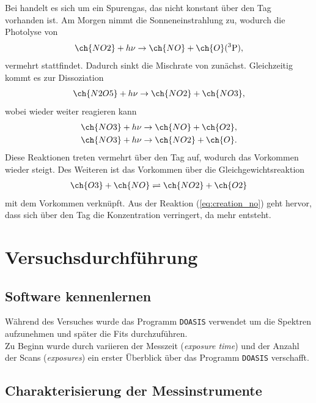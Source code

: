 \documentclass[12pt, a4paper, bibliography=totoc]{scrartcl}
\begin{document}
\begin{multicols}{2}
Bei  handelt es sich um ein Spurengas, das nicht konstant über den Tag vorhanden ist.
Am Morgen nimmt die Sonneneinstrahlung zu, wodurch die Photolyse von 
\begin{align}
    \ch{NO2} + h \nu \to \ch{NO} + \ch{O} (^3\text{P}), \label{eq:creation_no}
\end{align}
vermehrt stattfindet.
Dadurch sinkt die Mischrate von  zunächst.
Gleichzeitig kommt es zur Dissoziation 
\begin{align}
    \ch{N2O5} + h\nu \to \ch{NO2} + \ch{NO3},
\end{align}
wobei  wieder weiter reagieren kann
\begin{align}
    \ch{NO3} + h\nu \to \ch{NO} + \ch{O2}, \\
    \ch{NO3} + h\nu \to \ch{NO2} + \ch{O}.
\end{align}
Diese Reaktionen treten vermehrt über den Tag auf, wodurch das  Vorkommen wieder steigt. 
Des Weiteren ist das  Vorkommen über die Gleichgewichtsreaktion
\begin{align}
    \ch{O3} + \ch{NO} \rightleftharpoons \ch{NO2} + \ch{O2}
\end{align}
mit dem  Vorkommen verknüpft.
Aus der Reaktion (\ref{eq:creation_no}) geht hervor, dass sich über den Tag die  Konzentration verringert, da mehr  entsteht.

\section{Versuchsdurchführung}\label{sec:versuchsdurchführung}

\subsection{Software kennenlernen}\label{get_to_know_the_software}

Während des Versuches wurde das Programm \verb*+DOASIS+ verwendet um die Spektren aufzunehmen und später die Fits durchzuführen.\\
Zu Beginn wurde durch variieren der Messzeit (\textit{exposure time}) und der Anzahl der Scans (\textit{exposures}) ein erster Überblick über das Programm \verb*+DOASIS+ verschafft.

\subsection{Charakterisierung der Messinstrumente}\label{ssec:characteristic_of_the_instruments}


\end{multicols}
\end{document}
